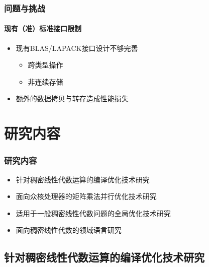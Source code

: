 \documentclass[aspectratio=169]{beamer}
\begin{document}
\begin{frame}
  \frametitle{问题与挑战}
  \framesubtitle{现有（准）标准接口限制}
  \begin{itemize}
  \item 现有BLAS/LAPACK接口设计不够完善
    \begin{itemize}
    \item 跨类型操作
    \item 非连续存储
    \end{itemize}
  \item 额外的数据拷贝与转存造成性能损失
  \end{itemize}
\end{frame}

\section{研究内容}

\begin{frame}
  \frametitle{研究内容}
  \begin{itemize}
  \item 针对稠密线性代数运算的编译优化技术研究
  \item 面向众核处理器的矩阵乘法并行优化技术研究
  \item 适用于一般稠密线性代数问题的全局优化技术研究
  \item 面向稠密线性代数的领域语言研究
  \end{itemize}
\end{frame}

\subsection[编译优化技术研究]{针对稠密线性代数运算的编译优化技术研究}
\end{document}
